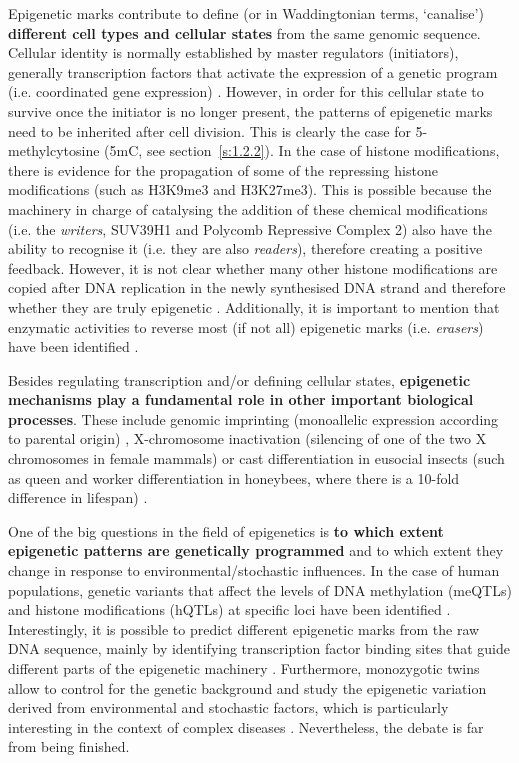 Epigenetic marks contribute to define (or in Waddingtonian terms, `canalise') \textbf{different cell types and cellular states} from the same genomic sequence. Cellular identity is normally established by master regulators (initiators), generally transcription factors that activate the expression of a genetic program (i.e. coordinated gene expression) \cite{Reinberg2018}. However, in order for this cellular state to survive once the initiator is no longer present, the patterns of epigenetic marks need to be inherited after cell division. This is clearly the case for 5-methylcytosine (\acrshort{5mC}, see section~\ref{s:1.2.2}). In the case of histone modifications, there is evidence for the propagation of some of the repressing histone modifications (such as H3K9me3 and H3K27me3). This is possible because the machinery in charge of catalysing the addition of these chemical modifications (i.e. the \textit{writers}, SUV39H1 and Polycomb Repressive Complex 2) also have the ability to recognise it (i.e. they are also \textit{readers}), therefore creating a positive feedback. However, it is not clear whether many other histone modifications are copied after DNA replication in the newly synthesised DNA strand and therefore whether they are truly epigenetic \cite{Reinberg2018}. Additionally, it is important to mention that enzymatic activities to reverse most (if not all) epigenetic marks (i.e. \textit{erasers}) have been identified \cite{Allis2016}.

\bigskip

Besides regulating transcription and/or defining cellular states, \textbf{epigenetic mechanisms play a fundamental role in other important biological processes}. These include genomic imprinting (monoallelic expression according to parental origin) \cite{Peters2014}, X-chromosome inactivation (silencing of one of the two X chromosomes in female mammals) \cite{Wutz2011} or cast differentiation in eusocial insects (such as queen and worker differentiation in honeybees, where there is a 10-fold difference in lifespan) \cite{Patalano2012,Remolina2008}.

\bigskip

One of the big questions in the field of epigenetics is \textbf{to which extent epigenetic patterns are genetically programmed} and to which extent they change in response to environmental/stochastic influences. In the case of human populations, genetic variants that affect the levels of DNA methylation (\acrshort{meQTLs}) and histone modifications (\acrshort{hQTLs}) at specific loci have been identified \cite{Taudt2016}. Interestingly, it is possible to predict different epigenetic marks from the raw DNA sequence, mainly by identifying transcription factor binding sites that guide different parts of the epigenetic machinery \cite{Whitaker2014}. Furthermore, monozygotic twins allow to control for the genetic background and study the epigenetic variation derived from environmental and stochastic factors, which is particularly interesting in the context of complex diseases \cite{Castillo-Fernandez2014}. Nevertheless, the debate is far from being finished.

